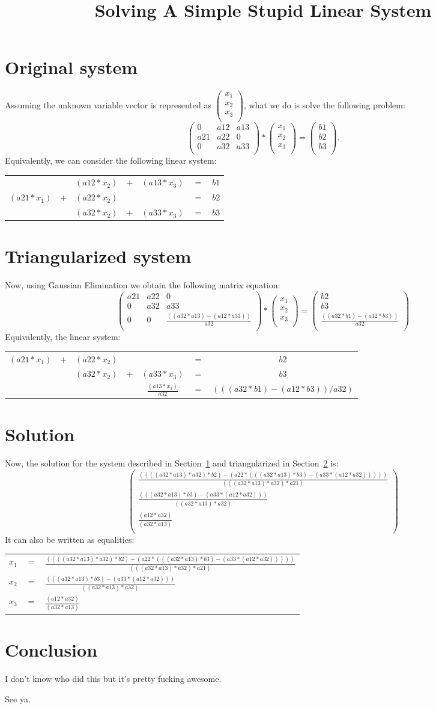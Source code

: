 \documentclass[11pt,a4paper,oneside]{article}
\title{
  Solving A Simple Stupid Linear System
}
\author{
}
\newcommand\matandtabspace{
.4em
}
\newcommand\originaltab{
\begin{tabular}{ c  c  c  c  c  c  c }
   &  & $(a12 * x_{2})$ & $+$ & $(a13 * x_{3})$ & $=$ & $b1$\\[\matandtabspace]
  $(a21 * x_{1})$ & $+$ & $(a22 * x_{2})$ & &  & $=$ & $b2$\\[\matandtabspace]
   &  & $(a32 * x_{2})$ & $+$ & $(a33 * x_{3})$ & $=$ & $b3$\\[\matandtabspace]
\end{tabular}
}
\newcommand\originalmat{
\begin{pmatrix}
  0 & a12 & a13\\[\matandtabspace]
  a21 & a22 & 0\\[\matandtabspace]
  0 & a32 & a33\\[\matandtabspace]
\end{pmatrix}
}
\newcommand\originalvec{
\begin{pmatrix}
  b1\\[\matandtabspace]
  b2\\[\matandtabspace]
  b3\\[\matandtabspace]
\end{pmatrix}
}
\newcommand\triangletab{
\begin{tabular}{ c  c  c  c  c  c  c }
  $(a21 * x_{1})$ & $+$ & $(a22 * x_{2})$ & &  & $=$ & $b2$\\[\matandtabspace]
   &  & $(a32 * x_{2})$ & $+$ & $(a33 * x_{3})$ & $=$ & $b3$\\[\matandtabspace]
   &  &  &  & $\frac{(a13 * x_{3})}{a32}$ & $=$ & $(((a32 * b1) - (a12 * b3)) / a32)$\\[\matandtabspace]
\end{tabular}
}
\newcommand\trianglemat{
\begin{pmatrix}
  a21 & a22 & 0\\[\matandtabspace]
  0 & a32 & a33\\[\matandtabspace]
  0 & 0 & \frac{((a32 * a13) - (a12 * a33))}{a32}\\[\matandtabspace]
\end{pmatrix}
}
\newcommand\trianglevec{
\begin{pmatrix}
  b2\\[\matandtabspace]
  b3\\[\matandtabspace]
  \frac{((a32 * b1) - (a12 * b3))}{a32}\\[\matandtabspace]
\end{pmatrix}
}
\newcommand\variablevec{
\begin{pmatrix}
  x_1\\[\matandtabspace]
  x_2\\[\matandtabspace]
  x_3\\[\matandtabspace]
\end{pmatrix}
}
\newcommand\solutiontab{
\begin{tabular}{ c c l }
  $x_1$ & $=$ & $\frac{((((a32 * a13) * a32) * b2) - (a22 * (((a32 * a13) * b3) - (a33 * (a12 * a32)))))}{(((a32 * a13) * a32) * a21)}$\\[\matandtabspace]
  $x_2$ & $=$ & $\frac{(((a32 * a13) * b3) - (a33 * (a12 * a32)))}{((a32 * a13) * a32)}$\\[\matandtabspace]
  $x_3$ & $=$ & $\frac{(a12 * a32)}{(a32 * a13)}$\\[\matandtabspace]
\end{tabular}
}
\newcommand\solutionmat{
\begin{pmatrix}
  \frac{((((a32 * a13) * a32) * b2) - (a22 * (((a32 * a13) * b3) - (a33 * (a12 * a32)))))}{(((a32 * a13) * a32) * a21)}\\[\matandtabspace]
  \frac{(((a32 * a13) * b3) - (a33 * (a12 * a32)))}{((a32 * a13) * a32)}\\[\matandtabspace]
  \frac{(a12 * a32)}{(a32 * a13)}\\[\matandtabspace]
\end{pmatrix}
}
\begin{document}
\normalem

\maketitle


\section{Original system}
\label{original}
Assuming the unknown variable vector is represented as $\variablevec$,
what we do is solve the following problem:
\[
\originalmat
 *
\variablevec
=
\originalvec
. \]
Equivalently, we can consider the following linear system:\\
\originaltab

\section{Triangularized system}
\label{triangle}
Now, using Gaussian Elimination we obtain the following matrix equation:
\[
\trianglemat
*
\variablevec
=
\trianglevec
\]
Equivalently, the linear system:\\
\triangletab

\section{Solution}
Now, the solution for the system described in Section~\ref{original} and
triangularized in Section~\ref{triangle} is:
\[ \solutionmat \]
It can also be written as equalities:\\
\solutiontab

\section{Conclusion}
I don't know who did this but it's pretty fucking awesome.
\newline

See ya.

\end{document}
